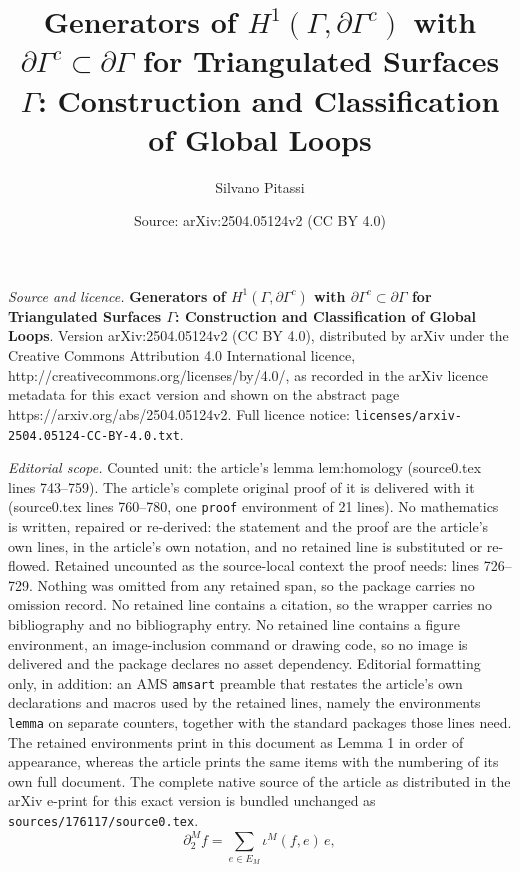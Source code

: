 \documentclass[10pt,a4paper]{amsart}
\title{{\textbf{\large{Generators of $H^1(\Gamma, \partial \Gamma^c)$ with $\partial \Gamma^c \subset \partial \Gamma$ for Triangulated Surfaces $\Gamma$: Construction and Classification of Global Loops}}}}
\author{Silvano Pitassi}
\date{Source: arXiv:2504.05124v2 (CC BY 4.0)}
\begin{document}
\maketitle

\noindent\emph{Source and licence.} {\textbf{\large{Generators of $H^1(\Gamma, \partial \Gamma^c)$ with $\partial \Gamma^c \subset \partial \Gamma$ for Triangulated Surfaces $\Gamma$: Construction and Classification of Global Loops}}}. Version arXiv:2504.05124v2 (CC BY 4.0), distributed by arXiv under the Creative Commons Attribution 4.0 International licence, http://creativecommons.org/licenses/by/4.0/, as recorded in the arXiv licence metadata for this exact version and shown on the abstract page https://arxiv.org/abs/2504.05124v2. Full licence notice: \texttt{licenses/arxiv-2504.05124-CC-BY-4.0.txt}.\par\smallskip

\noindent\textit{Editorial scope.} Counted unit: the article's lemma lem:homology (source0.tex lines 743--759). The article's complete original proof of it is delivered with it (source0.tex lines 760--780, one \texttt{proof} environment of 21 lines). No mathematics is written, repaired or re-derived: the statement and the proof are the article's own lines, in the article's own notation, and no retained line is substituted or re-flowed.  Retained uncounted as the source-local context the proof needs: lines 726--729.  Nothing was omitted from any retained span, so the package carries no omission record.  No retained line contains a citation, so the wrapper carries no bibliography and no bibliography entry.  No retained line contains a figure environment, an image-inclusion command or drawing code, so no image is delivered and the package declares no asset dependency.  Editorial formatting only, in addition: an AMS \texttt{amsart} preamble that restates the article's own declarations and macros used by the retained lines, namely the environments \texttt{lemma} on separate counters, together with the standard packages those lines need.  The retained environments print in this document as Lemma 1 in order of appearance, whereas the article prints the same items with the numbering of its own full document.  The complete native source of the article as distributed in the arXiv e-print for this exact version is bundled unchanged as \texttt{sources/176117/source0.tex}.
\begin{equation}
\partial^M_2 f = \sum_{e \in E_M} \iota^M(f, e) \, e,
\label{eq:expansion}
\end{equation}
\end{document}
